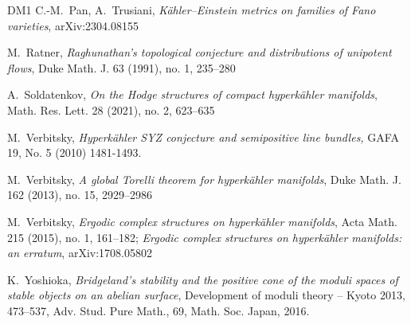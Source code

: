 \documentclass[11pt]{article}
\newcommand{\6}{\partial}
\begin{document}
{\begin{thebibliography}{DM1}
C.-M.\ Pan, A.\ Trusiani, {\it K\"ahler--Einstein metrics on families of Fano varieties},
arXiv:2304.08155

M.\ Ratner, {\it Raghunathan's topological conjecture and distributions of unipotent flows},
Duke Math. J. 63 (1991), no. 1, 235--280

A.\ Soldatenkov, {\it On the Hodge structures of compact hyperk\"ahler manifolds},
Math. Res. Lett. 28 (2021), no. 2, 623--635


M.\ Verbitsky, 
{\em Hyperk\"ahler SYZ conjecture and semipositive line bundles,} 
GAFA 19, No. 5 (2010) 1481-1493. 

M.\ Verbitsky, {\it A global Torelli theorem for hyperk\"ahler manifolds},
Duke Math. J. 162 (2013), no. 15, 2929--2986

M.\ Verbitsky, {\it Ergodic complex structures on hyperk\"ahler manifolds},
Acta Math. 215 (2015), no. 1, 161--182;
{\it Ergodic complex structures on hyperk\"ahler manifolds: an erratum}, arXiv:1708.05802

 K.\ Yoshioka, {\em Bridgeland's stability
  and the positive cone of the 
moduli spaces of stable objects on an abelian
surface}, Development of moduli theory -- Kyoto 2013,
473--537, Adv. Stud. Pure Math., 69, Math. Soc. Japan,
2016.

\end{thebibliography}
}


\hfill

\end{document}
